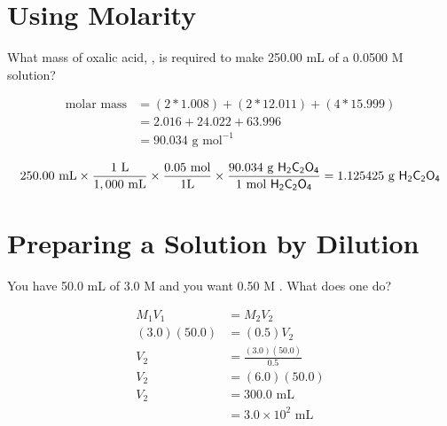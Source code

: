 \documentclass[
	chapter=4
]{chem122notes}
\begin{document}
\section{Using Molarity}\label{sec:using-molarity}
What mass of oxalic acid, , is required to make 250.00 mL of a 0.0500 M solution?

\begin{equation*}
\begin{aligned}
	\mbox{molar mass} &= (2*1.008) + (2*12.011) + (4 * 15.999)\\
			  &= 2.016 + 24.022 + 63.996\\
			  &= 90.034 \mbox{ g mol}^{-1}\\
\end{aligned}
\end{equation*}
\begin{equation*}
\begin{aligned}
	250.00 \mbox{ mL} \times \frac{1 \mbox{ L}}{1,000 \mbox{ mL}} \times \frac{0.05 \mbox{ mol}}{1 \mbox{L}} \times \frac{90.034 \mbox{ g }\ce{H2C2O4}}{1 \mbox{ mol } \ce{H2C2O4}} = 1.125425 \mbox{ g }\ce{H2C2O4}\\
\end{aligned}
\end{equation*}

\section{Preparing a Solution by Dilution}\label{sec:preparing-a-solution-by-dilution}
You have 50.0 mL of 3.0 M  and you want 0.50 M \@.
What does one do?

\begin{equation*}
\begin{aligned}
	M_{1}V_{1} &= M_{2}V_{2}\\
	(3.0)(50.0) &= (0.5)V_{2}\\
	V_{2} &= \frac{(3.0)(50.0)}{0.5}\\
	V_{2} &= (6.0)(50.0)\\
	V_{2} &= 300.0\mbox{ mL}\\
		  &= 3.0\times10^{2}\mbox{ mL}
\end{aligned}
\end{equation*}
\end{document}
